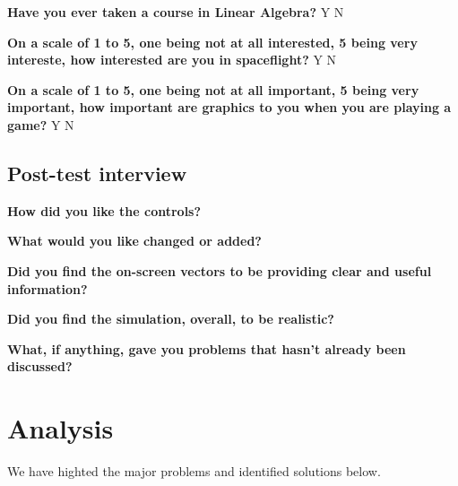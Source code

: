 \vspace{5mm}
\noindent\textbf{Have you ever taken a course in Linear Algebra?} Y N

\vspace{5mm}
\noindent\textbf{On a scale of 1 to 5, one being not at all interested, 5 being very intereste, how interested are you in spaceflight?} Y N

\vspace{5mm}
\noindent\textbf{On a scale of 1 to 5, one being not at all important, 5 being very important, how important are graphics to you when you are playing a game?} Y N

\subsection{Post-test interview}

\vspace{5mm}
\noindent\textbf{How did you like the controls?}

\vspace{5mm}
\noindent\textbf{What would you like changed or added?}

\vspace{5mm}
\noindent\textbf{Did you find the on-screen vectors to be providing clear and useful information?}

\vspace{5mm}
\noindent\textbf{Did you find the simulation, overall, to be realistic?}

\vspace{5mm}
\noindent\textbf{What, if anything, gave you problems that hasn't already been discussed?}

\section{Analysis}



We have highted the major problems and identified solutions below.

